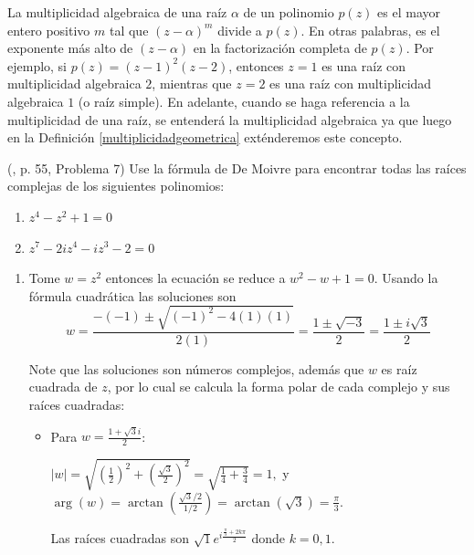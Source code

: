 \begin{rem}
La multiplicidad algebraica de una raíz $\alpha$ de un polinomio $p(z)$ es el mayor entero positivo $m$ tal que $(z-\alpha)^m$ divide a $p(z)$. En otras palabras, es el exponente más alto de $(z-\alpha)$ en la factorización completa de $p(z)$. Por ejemplo, si $p(z) = (z-1)^2(z-2)$, entonces $z=1$ es una raíz con multiplicidad algebraica $2$, mientras que $z=2$ es una raíz con multiplicidad algebraica $1$ (o raíz simple). En adelante, cuando se haga referencia a la multiplicidad de una raíz, se entenderá la multiplicidad algebraica ya que luego en la Definición \ref{multiplicidadgeometrica} exténderemos este concepto.
\end{rem}

\begin{prob}(\cite{andreescu2014complex}, p. 55, Problema 7) Use la fórmula de De Moivre para encontrar todas las raíces complejas de los siguientes polinomios:

\begin{multicols}{2}
\begin{enumerate}[$a)$]
\item $z^4-z^2+1=0$
\item $z^7-2iz^4-iz^3-2=0$
\end{enumerate}
\end{multicols}

\begin{myproof}
\begin{enumerate}[$a)$]
\item Tome $w=z^2$ entonces la ecuación se reduce a $w^2-w+1=0$. Usando la fórmula cuadrática las soluciones son  $$w = \frac{-(-1)\pm\sqrt{(-1)^2-4(1)(1)}}{2(1)} = \frac{1\pm\sqrt{-3}}{2} = \frac{1\pm i\sqrt{3}}{2}$$

Note que las soluciones son números complejos, además que $w$ es raíz cuadrada de $z$, por lo cual se calcula la forma polar de cada complejo y sus raíces cuadradas:

\begin{itemize}
\item Para $w=\frac{1+\sqrt{3}i}{2}$:  

$|w| = \sqrt{\left( \frac{1}{2} \right)^2 + \left( \frac{\sqrt{3}}{2} \right)^2} = \sqrt{\frac{1}{4}+\frac{3}{4}} = 1,$ y $\arg(w) = \arctan\left( \frac{\sqrt{3}/2}{1/2} \right) = \arctan(\sqrt{3}) = \frac{\pi}{3}.$


Las raíces cuadradas son $\sqrt{1} e^{i\frac{\frac{\pi}{3}+2k\pi}{2}}$ donde $k=0,1$.


\end{itemize}
\end{enumerate}
\end{myproof}
\end{prob}
